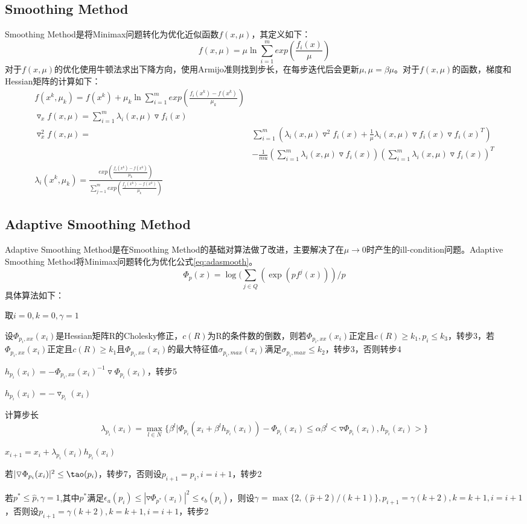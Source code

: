 \documentclass{ctexart}
\begin{document}
\subsection{Smoothing Method}
Smoothing Method是将Minimax问题转化为优化近似函数$f(x,\mu)$，其定义如下：
\[f(x,\mu) = \mu\ln\sum_{i=1}^{m}{exp(\frac{f_i(x)}{\mu})}\]
对于$f(x,\mu)$的优化使用牛顿法求出下降方向，使用Armijo准则找到步长，在每步迭代后会更新$\mu, \mu = \beta\mu$。对于$f(x,\mu)$的函数，梯度和Hessian矩阵的计算如下：
$$
\begin{aligned}
f(x^k,\mu_k)=f(x^k)+\mu_k\ln\sum_{i=1}^{m}{exp(\frac{f_i(x^k)-f(x^k)}{\mu_k})}\\
\triangledown_xf(x,\mu)=\sum_{i=1}^m{\lambda_i(x,\mu)\triangledown f_i(x)}\\
\triangledown^2_xf(x,\mu)=&\sum_{i=1}^m(\lambda_i(x,\mu)\triangledown^2f_i(x)+\frac{1}{\mu}\lambda_i(x,\mu)\triangledown f_i(x)\triangledown f_i(x)^T)\\
			& -\frac{1}{mu}(\sum_{i=1}^{m}\lambda_i(x,\mu)\triangledown f_i(x))(\sum_{i=1}^m{\lambda_i(x,\mu)\triangledown f_i(x)})^T\\
\lambda_i(x^k,\mu_k) = \frac{exp(\frac{f_i(x^k)-f(x^k)}{\mu_k})}{\sum_{j=1}^{m}{exp(\frac{f_j(x^k)-f(x^k)}{\mu_k})}}
\end{aligned}
$$
\subsection{Adaptive Smoothing Method}
Adaptive Smoothing Method是在Smoothing Method的基础对算法做了改进，主要解决了在$\mu\rightarrow 0$时产生的ill-condition问题。Adaptive Smoothing Method将Minimax问题转化为优化公式\ref{eq:adasmooth}。
\begin{equation}
\label{eq:adasmooth}
\Phi_p(x)=\log(\sum_{j\in Q}{(\exp(pf^j(x)))/p}
\end{equation}
具体算法如下：
\begin{description}
\item 取$i=0,k=0,\gamma = 1$
\item 设$\Phi_{p_i,xx}(x_i)$是Hessian矩阵R的Cholesky修正，$c(R)$为R的条件数的倒数，则若$\Phi_{p_i,xx}(x_i)$正定且$c(R)\geq k_1,p_i\leq k_3$，转步3，若$\Phi_{p_i,xx}(x_i)$正定且$c(R)\geq k_1$且$\Phi_{p_i,xx}(x_i)$的最大特征值$\sigma_{p_i,max}(x_i)$满足$\sigma_{p_i,max}\leq k_2$，转步3，否则转步4
\item $h_{p_i}(x_i) = -\Phi_{p_i,xx}(x_i)^{-1}\triangledown\Phi_{p_i}(x_i)$，转步5
\item $h_{p_i}(x_i) = -\triangledown_{p_i}(x_i)$
\item 计算步长
	\[\lambda_{p_i}(x_i) = \max_{l\in N}\{\beta^l|\Phi_{p_i}(x_i+\beta^lh_{p_i}(x_i))-\Phi_{p_i}(x_i)\leq \alpha\beta^l<\triangledown\Phi_{p_i}(x_i),h_{p_i}(x_i)>\}\]
\item $x_{i+1} = x_i + \lambda_{p_i}(x_i)h_{p_i}(x_i)$
\item 若$|\triangledown\Phi_{p_i}(x_i)|^2\leq \tao(p_i)$，转步7，否则设$p_{i+1}=p_i, i=i+1$，转步2
\item 若$p^*\leq \hat{p},\gamma=1$,其中$p^*$满足$\epsilon_a(p_i)\leq |\triangledown\Phi_{p^*}(x_i)|^2\leq \epsilon_b(p_i)$，则设$\gamma=\max\{2,(\hat{p}+2)/(k+1)\}, p_{i+1}=\gamma(k+2),k=k+1, i=i+1$，否则设$p_{i+1}=\gamma(k+2),k=k+1,i=i+1$，转步2
\end{description}
\end{document}
